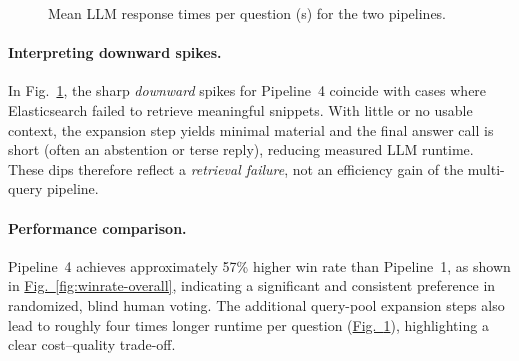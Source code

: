 \documentclass[manuscript,screen]{acmart}
\edef\PoneMean{\pgfplotsretval}
\edef\PfourMean{\pgfplotsretval}
\begin{document}
\begin{CCSXML}
\begin{figure}[H]
\caption{Mean LLM response times per question (s) for the two pipelines.}
\label{fig:time-per-question}
\end{figure}

\paragraph{Interpreting downward spikes.}
In Fig.~\ref{fig:time-per-question}, the sharp \emph{downward} spikes for
Pipeline~4 coincide with cases where Elasticsearch failed to retrieve
meaningful snippets. With little or no usable context, the expansion step
yields minimal material and the final answer call is short (often an abstention
or terse reply), reducing measured LLM runtime. These dips therefore reflect a
\emph{retrieval failure}, not an efficiency gain of the multi-query
pipeline.

\paragraph{Performance comparison.}
\label{performance-comparison}
Pipeline~4 achieves approximately 57\% higher win rate than Pipeline~1, as shown in 
\hyperref[fig:winrate-overall]{Fig.~\ref{fig:winrate-overall}}, indicating a significant and consistent 
preference in randomized, blind human voting. The additional query-pool expansion steps 
also lead to roughly four times longer runtime per question (\hyperref[fig:time-per-question]{Fig.~\ref{fig:time-per-question}}), highlighting a clear cost–quality trade-off.


\end{CCSXML}
\end{document}
